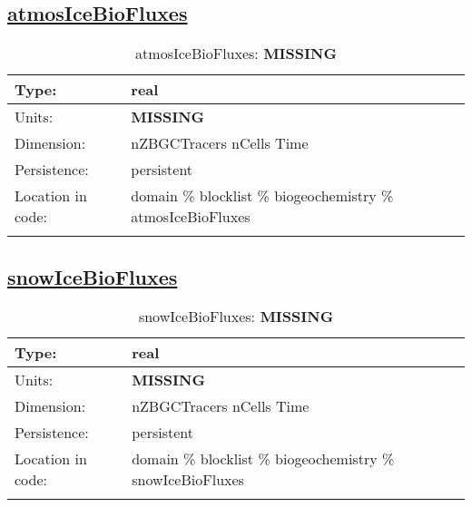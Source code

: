 \subsection[atmosIceBioFluxes]{\hyperref[sec:var_tab_biogeochemistry]{atmosIceBioFluxes}}
\label{subsec:var_sec_biogeochemistry_atmosIceBioFluxes}
\begin{center}
\begin{longtable}{| p{2.0in} | p{4.0in} |}
        \hline 
        Type: & real \\
        \hline 
        Units: & {\bf \color{red} MISSING} \\
        \hline 
        Dimension: & nZBGCTracers nCells Time \\
        \hline 
        Persistence: & persistent \\
        \hline 
         Location in code: & domain \% blocklist \% biogeochemistry \% atmosIceBioFluxes \\
         \hline 
    \caption{atmosIceBioFluxes: {\bf \color{red} MISSING}}
\end{longtable}
\end{center}
\subsection[snowIceBioFluxes]{\hyperref[sec:var_tab_biogeochemistry]{snowIceBioFluxes}}
\label{subsec:var_sec_biogeochemistry_snowIceBioFluxes}
\begin{center}
\begin{longtable}{| p{2.0in} | p{4.0in} |}
        \hline 
        Type: & real \\
        \hline 
        Units: & {\bf \color{red} MISSING} \\
        \hline 
        Dimension: & nZBGCTracers nCells Time \\
        \hline 
        Persistence: & persistent \\
        \hline 
         Location in code: & domain \% blocklist \% biogeochemistry \% snowIceBioFluxes \\
         \hline 
    \caption{snowIceBioFluxes: {\bf \color{red} MISSING}}
\end{longtable}
\end{center}
